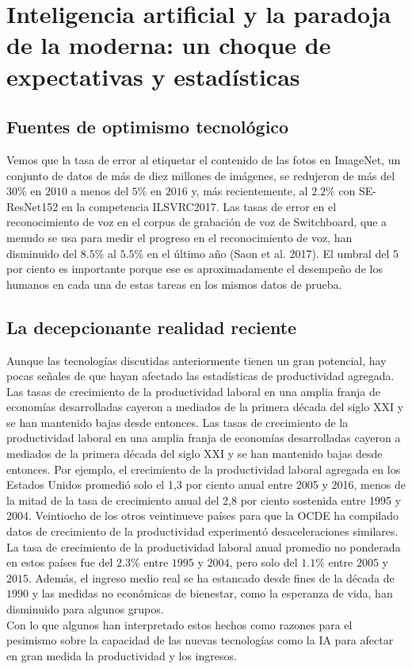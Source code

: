 \chapter{Inteligencia artificial y la paradoja de la moderna: un choque de expectativas y estadísticas}

\section{Fuentes de optimismo tecnológico}
Vemos que la tasa de error al etiquetar el contenido de las fotos en ImageNet, un conjunto de datos de más de diez millones de imágenes, se redujeron de más del $30\%$ en $2010$ a menos del $5\%$ en $2016$ y, más recientemente, al $2.2\%$ con SE-ResNet152 en la competencia ILSVRC2017. Las tasas de error en el reconocimiento de voz en el corpus de grabación de voz de Switchboard, que a menudo se usa para medir el progreso en el reconocimiento de voz, han disminuido del $8.5\%$ al $5.5\%$ en el último año (Saon et al. 2017). El umbral del $5$ por ciento es importante porque ese es aproximadamente el desempeño de los humanos en cada una de estas tareas en los mismos datos de prueba.

\section{La decepcionante realidad reciente}
Aunque las tecnologías discutidas anteriormente tienen un gran potencial, hay pocas señales de que hayan afectado las estadísticas de productividad agregada. Las tasas de crecimiento de la productividad laboral en una amplia franja de economías desarrolladas cayeron a mediados de la primera década del siglo XXI y se han mantenido bajas desde entonces. Las tasas de crecimiento de la productividad laboral en una amplia franja de economías desarrolladas cayeron a mediados de la primera década del siglo XXI y se han mantenido bajas desde entonces. Por ejemplo, el crecimiento de la productividad laboral agregada en los Estados Unidos promedió solo el 1,3 por ciento anual entre 2005 y 2016, menos de la mitad de la tasa de crecimiento anual del 2,8 por ciento sostenida entre 1995 y 2004. Veintiocho de los otros veintinueve países para que la OCDE ha compilado datos de crecimiento de la productividad experimentó desaceleraciones similares. La tasa de crecimiento de la productividad laboral anual promedio no ponderada en estos países fue del $2.3\%$ entre $1995$ y $2004$, pero solo del $1.1\%$ entre $2005$ y $2015$. Además, el ingreso medio real se ha estancado desde fines de la década de $1990$ y las medidas no económicas de bienestar, como la esperanza de vida, han disminuido para algunos grupos.\\
Con lo que algunos han interpretado estos hechos como razones para el pesimismo sobre la capacidad de las nuevas tecnologías como la IA para afectar en gran medida la productividad y los ingresos.

